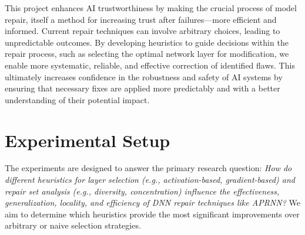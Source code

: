 \documentclass{article}
\begin{document}

This project enhances AI trustworthiness by making the crucial process of model repair, itself a method for increasing trust after failures—more efficient and informed.
Current repair techniques can involve arbitrary choices, leading to unpredictable outcomes.
By developing heuristics to guide decisions within the repair process, such as selecting the optimal network layer for modification, we enable more systematic, reliable, and effective correction of identified flaws.
This ultimately increases confidence in the robustness and safety of AI systems by ensuring that necessary fixes are applied more predictably and with a better understanding of their potential impact.

\section{Experimental Setup}

The experiments are designed to answer the primary research question:
\textit{How do different heuristics for layer selection (e.g., activation-based, gradient-based) and repair set analysis (e.g., diversity, concentration) influence the effectiveness, generalization, locality, and efficiency of DNN repair techniques like APRNN?}
We aim to determine which heuristics provide the most significant improvements over arbitrary or naive selection strategies.
\end{document}

